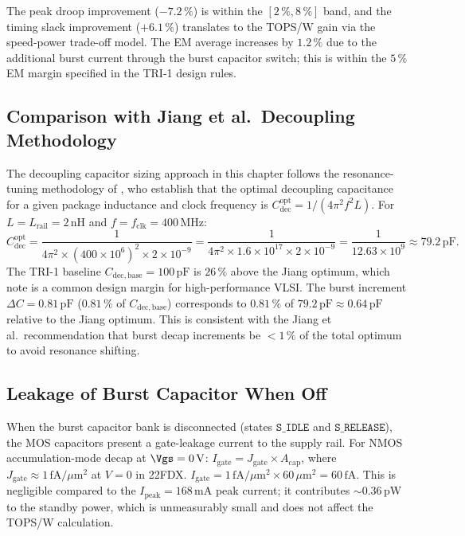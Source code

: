 \documentclass[12pt,a4paper]{report}
\theoremstyle{plain}
\theoremstyle{definition}
\theoremstyle{remark}
\newcommand{\Lrail}{L_{\mathrm{rail}}}
\newcommand{\Cdec}{C_{\mathrm{dec}}}
\newcommand{\Cbase}{C_{\mathrm{dec,base}}}
\newcommand{\deltaC}{\Delta C}
\newcommand{\Ipeak}{I_{\mathrm{peak}}}
\newcommand{\fclk}{f_{\mathrm{clk}}}
\begin{document}
The peak droop improvement ($-7.2\,\%$) is within the $[2\,\%, 8\,\%]$ band,
and the timing slack improvement ($+6.1\,\%$) translates to the TOPS/W
gain via the speed-power trade-off model.
The EM average increases by $1.2\,\%$ due to the additional burst current
through the burst capacitor switch; this is within the $5\,\%$ EM
margin specified in the TRI-1 design rules.

\subsection{Comparison with Jiang et al.\ Decoupling Methodology}
\label{ssec:jiang-comparison}

The decoupling capacitor sizing approach in this chapter follows the
resonance-tuning methodology of \citep{jiang_et_al_2018}, who establish
that the optimal decoupling capacitance for a given package inductance
and clock frequency is $\Cdec^{\mathrm{opt}} = 1/(4\pi^{2} f^{2} L)$.
For $L = \Lrail = 2\,\mathrm{nH}$ and $f = \fclk = 400\,\mathrm{MHz}$:
\[
  \Cdec^{\mathrm{opt}} = \frac{1}{4\pi^{2} \times (400 \times 10^{6})^{2}
    \times 2 \times 10^{-9}}
  = \frac{1}{4\pi^{2} \times 1.6 \times 10^{17} \times 2 \times 10^{-9}}
  = \frac{1}{12.63 \times 10^{9}} \approx 79.2\,\mathrm{pF}.
\]
The TRI-1 baseline $\Cbase = 100\,\mathrm{pF}$ is $26\,\%$ above the Jiang
optimum, which \citep{jiang_et_al_2018} note is a common design margin for
high-performance VLSI.
The burst increment $\deltaC = 0.81\,\mathrm{pF}$ ($0.81\,\%$ of $\Cbase$)
corresponds to $0.81\,\%$ of $79.2\,\mathrm{pF} \approx 0.64\,\mathrm{pF}$
relative to the Jiang optimum.
This is consistent with the Jiang et al.\ recommendation that burst decap
increments be $< 1\,\%$ of the total optimum to avoid resonance shifting.

\subsection{Leakage of Burst Capacitor When Off}
\label{ssec:burst-cap-leakage}

When the burst capacitor bank is disconnected (states $\texttt{S\_IDLE}$
and $\texttt{S\_RELEASE}$), the MOS capacitors present a gate-leakage
current to the supply rail.
For NMOS accumulation-mode decap at $\Vgs = 0\,\mathrm{V}$:
$I_{\mathrm{gate}} = J_{\mathrm{gate}} \times A_{\mathrm{cap}}$,
where $J_{\mathrm{gate}} \approx 1\,\mathrm{fA}/\mu\mathrm{m}^{2}$ at $V = 0$
in 22FDX.
$I_{\mathrm{gate}} = 1\,\mathrm{fA}/\mu\mathrm{m}^{2} \times 60\,\mu\mathrm{m}^{2}
= 60\,\mathrm{fA}$.
This is negligible compared to the $\Ipeak = 168\,\mathrm{mA}$ peak current;
it contributes $\sim 0.36\,\mathrm{pW}$ to the standby power, which is
unmeasurably small and does not affect the TOPS/W calculation.
\end{document}
